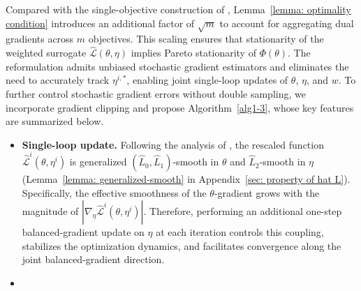 \documentclass[twoside]{article} %
\theoremstyle{plain}
\theoremstyle{definition}
\theoremstyle{remark}
\newcommand{\hL}{\hat{L}}
\newcommand{\fhL}{\hat{\mathcal{L}}}
\begin{document}
Compared with the single-objective construction of \citet{jinnonconvexdro}, Lemma~\ref{lemma: optimality condition} introduces an additional factor of \(\sqrt{m}\) to account for aggregating dual gradients across \(m\) objectives. This scaling ensures that stationarity of the weighted surrogate \(\fhL(\theta,\eta)\) implies Pareto stationarity of \(\Phi(\theta)\). The reformulation admits unbiased stochastic gradient estimators and eliminates the need to accurately track \(\eta^{i,*}\), enabling joint single-loop updates of \(\theta\), \(\eta\), and \(w\). To further control stochastic gradient errors without double sampling, we incorporate gradient clipping and propose Algorithm~\ref{alg1-3}, whose key features are summarized below.
\begin{itemize}[leftmargin = *, topsep = 0pt]
\item \textbf{Single-loop update.} %
Following the analysis of \citet{qirevistfDRO}, the rescaled function \(\fhL^i(\theta,\eta^i)\) is generalized \((\hL_0,\hL_1)\)-smooth in \(\theta\) and \(\hL_2\)-smooth in \(\eta\) (Lemma~\ref{lemma: generalized-smooth} in Appendix~\ref{sec: property of hat L}). Specifically, the effective smoothness of the \(\theta\)-gradient grows with the magnitude of \(|\nabla_{\eta}\fhL^i(\theta,\eta^i)|\). Therefore, performing an additional one-step balanced-gradient update on \(\eta\) at each iteration controls this coupling, stabilizes the optimization dynamics, and facilitates convergence along the joint balanced-gradient direction.
\item %

\end{itemize}
\end{document}
